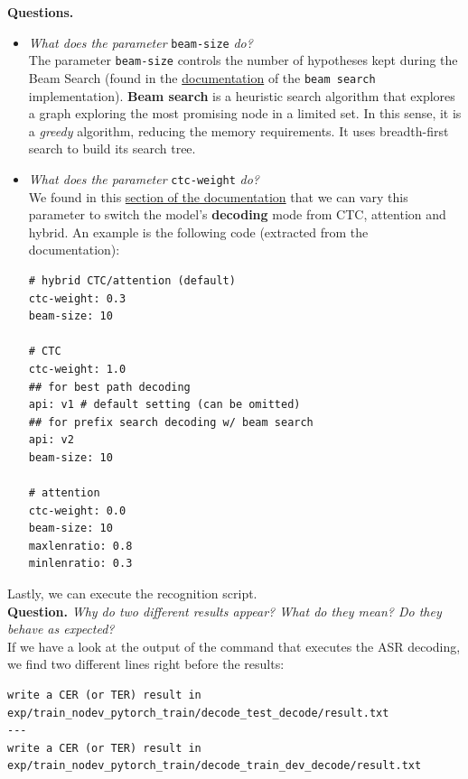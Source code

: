 \documentclass[a4paper]{article}
\def\inline{\lstinline[basicstyle=\ttfamily,keywordstyle={}]}
\begin{document}
\textbf{Questions.}
\begin{itemize}
  \item \emph{What does the parameter} \inline{beam-size} \emph{do?}\\

        The parameter \inline{beam-size} controls the number of hypotheses kept during the Beam Search (found in the \href{https://espnet.github.io/espnet/_gen/espnet.nets.html?highlight=beam#espnet-nets-batch-beam-search}{documentation} of the \inline{beam search} implementation). \textbf{Beam search} is a heuristic search algorithm that explores a graph exploring the most promising node in a limited set. In this sense, it is a \emph{greedy} algorithm, reducing the memory requirements. It uses breadth-first search to build its search tree.

  \item \emph{What does the parameter} \inline{ctc-weight} \emph{do?}\\

        We found in this \href{https://espnet.github.io/espnet/tutorial.html?highlight=ctc%20weight#ctc-attention-and-hybrid-ctc-attention}{section of the documentation} that we can vary this parameter to switch the model's \textbf{decoding} mode from CTC, attention and hybrid. An example is the following code (extracted from the documentation):
        \begin{verbatim}
# hybrid CTC/attention (default)
ctc-weight: 0.3
beam-size: 10

# CTC
ctc-weight: 1.0
## for best path decoding
api: v1 # default setting (can be omitted)
## for prefix search decoding w/ beam search
api: v2
beam-size: 10

# attention
ctc-weight: 0.0
beam-size: 10
maxlenratio: 0.8
minlenratio: 0.3
  \end{verbatim}
\end{itemize}


Lastly, we can execute the recognition script.\\

\textbf{Question.} \emph{Why do two different results appear? What do they mean? Do they behave as expected?}\\

If we have a look at the output of the command that executes the ASR decoding, we find two different lines right before the results:
\begin{verbatim}
write a CER (or TER) result in exp/train_nodev_pytorch_train/decode_test_decode/result.txt
---
write a CER (or TER) result in exp/train_nodev_pytorch_train/decode_train_dev_decode/result.txt
\end{verbatim}
\end{document}
